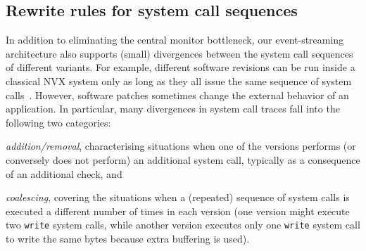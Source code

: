 



\subsection{Rewrite rules for system call sequences}
\label{sec:rw}

In addition to eliminating the central monitor bottleneck, our
event-streaming architecture also supports (small) divergences between
the system call sequences of different variants.  For example,
different software revisions can be run inside a classical NVX
system only as long as they all issue the same sequence of system
calls~\cite{mx}.  However, software patches sometimes change the
external behavior of an application.  In particular, many divergences
in system call traces fall into the following two categories:
\begin{inparaenum}[(i)]
\item \emph{addition/removal}, characterising situations when one of
  the versions performs (or conversely does not perform) an additional
  system call, typically as a consequence of an additional check, and
\item \emph{coalescing}, covering the situations when a (repeated)
  sequence of system calls is executed a different number of times in
  each version (\eg one version might execute two \lstinline`write`
  system calls, while another version executes only one
  \lstinline`write` system call to write the same bytes because extra
  buffering is used).

\end{inparaenum}

